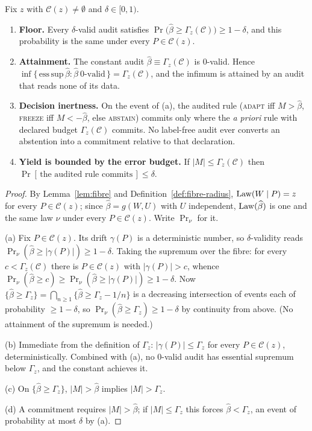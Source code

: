 \begin{theorem}\label{thm:beta-minimax}
Fix $z$ with $\mathcal C(z)\neq\emptyset$ and $\delta\in[0,1)$.
\begin{enumerate}
\item[\textnormal{(a)}]\textbf{Floor.} Every $\delta$-valid audit satisfies
$\Pr\bigl(\widehat\beta\ge\Gamma_z(\mathcal C)\bigr)\ge1-\delta$, and this probability is the
same under every $P\in\mathcal C(z)$.
\item[\textnormal{(b)}]\textbf{Attainment.} The constant audit
$\widehat\beta\equiv\Gamma_z(\mathcal C)$ is $0$-valid. Hence
$\inf\{\,\mathrm{ess\,sup}\,\widehat\beta:\widehat\beta\ \text{$0$-valid}\,\}=\Gamma_z(\mathcal C)$,
and the infimum is attained by an audit that reads none of its data.
\item[\textnormal{(c)}]\textbf{Decision inertness.} On the event of (a), the audited rule
(\textsc{adapt} iff $M>\widehat\beta$, \textsc{freeze} iff $M<-\widehat\beta$, else
\textsc{abstain}) commits only where the \emph{a priori} rule with declared budget
$\Gamma_z(\mathcal C)$ commits. No label-free audit ever converts an abstention into a
commitment relative to that declaration.
\item[\textnormal{(d)}]\textbf{Yield is bounded by the error budget.} If
$|M|\le\Gamma_z(\mathcal C)$ then $\Pr[\,\text{the audited rule commits}\,]\le\delta$.
\end{enumerate}
\end{theorem}

\begin{proof}
By Lemma~\ref{lem:fibre} and Definition~\ref{def:fibre-radius}, $\mathrm{Law}(W\mid P)=z$ for every
$P\in\mathcal C(z)$; since $\widehat\beta=g(W,U)$ with $U$ independent, $\mathrm{Law}(\widehat\beta)$
is one and the same law $\nu$ under every $P\in\mathcal C(z)$. Write $\Pr_\nu$ for it.

(a) Fix $P\in\mathcal C(z)$. Its drift $\gamma(P)$ is a deterministic number, so
$\delta$-validity reads $\Pr_\nu(\widehat\beta\ge|\gamma(P)|)\ge1-\delta$. Taking the
supremum over the fibre: for every $c<\Gamma_z(\mathcal C)$ there is $P\in\mathcal C(z)$ with
$|\gamma(P)|>c$, whence $\Pr_\nu(\widehat\beta\ge c)\ge\Pr_\nu(\widehat\beta\ge|\gamma(P)|)\ge1-\delta$.
Now $\{\widehat\beta\ge\Gamma_z\}=\bigcap_{n\ge1}\{\widehat\beta\ge\Gamma_z-1/n\}$ is a
decreasing intersection of events each of probability $\ge1-\delta$, so
$\Pr_\nu(\widehat\beta\ge\Gamma_z)\ge1-\delta$ by continuity from above. (No attainment of the
supremum is needed.)

(b) Immediate from the definition of $\Gamma_z$: $|\gamma(P)|\le\Gamma_z$ for every
$P\in\mathcal C(z)$, deterministically. Combined with (a), no $0$-valid audit has essential
supremum below $\Gamma_z$, and the constant achieves it.

(c) On $\{\widehat\beta\ge\Gamma_z\}$, $|M|>\widehat\beta$ implies $|M|>\Gamma_z$.

(d) A commitment requires $|M|>\widehat\beta$; if $|M|\le\Gamma_z$ this forces
$\widehat\beta<\Gamma_z$, an event of probability at most $\delta$ by (a).
\end{proof}

